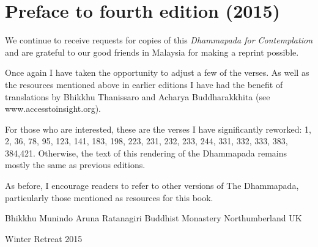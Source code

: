 
\chapter{Preface to fourth edition (2015)}

We continue to receive requests for copies of this \emph{Dhammapada for Contemplation} and are grateful to our good friends in Malaysia for making a reprint possible.

Once again I have taken the opportunity to adjust a few of the verses. As well as the resources mentioned above in earlier editions I have had the benefit of translations by Bhikkhu Thanissaro and Acharya Buddharakkhita (see www.accesstoinsight.org). 

For those who are interested, these are the verses I have significantly reworked: 1, 2, 36, 78, 95, 123, 141, 183, 198, 223, 231, 232, 233, 244, 331, 332, 333, 383, 384,421. Otherwise, the text of this rendering of the Dhammapada remains mostly the same as previous editions. 

As before, I encourage readers to refer to other versions of The Dhammapada, particularly those mentioned as resources for this book.

Bhikkhu Munindo
Aruna Ratanagiri Buddhist Monastery
Northumberland
UK

Winter Retreat 2015
